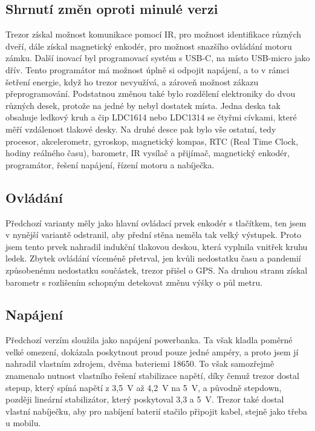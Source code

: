 \subsection*{Shrnutí změn oproti minulé verzi}

Trezor získal možnost komunikace pomocí IR, pro možnost identifikace růz\-ných dveří, dále získal magnetický enkodér, pro možnost snazšího ovládání
motoru zámku. 
Další inovací byl programovací systém s USB-C, na místo USB-micro jako dřív. Tento programátor má možnost úplně si odpojit napáje\-ní, a to v rámci šetření 
energie, když ho trezor nevyužívá, a zároveň možnost zákazu přeprogramování.
Podstatnou změnou také bylo rozdělení elektroniky do dvou různých desek, protože na jedné by nebyl dostatek místa. Jedna deska tak obsahuje ledkový 
kruh a čip LDC1614 nebo LDC1314 se čtyřmi cívkami, které měří vzdálenost tlakové desky. Na druhé desce pak bylo vše ostatní, tedy procesor, akcelerometr,
gyroskop, magnetický kompas, RTC (Real Time Clock, hodiny reálného času), barometr, IR vysílač a přijímač, magnetický enkodér, programátor, řešení 
napájení, řízení motoru a nabíječka.

\subsection*{Ovládání}
Předchozí varianty měly jako hlavní ovládací prvek enkodér s tlačítkem, ten jsem v nynější variantě odstranil, aby přední stěna neměla tak velký 
výstupek. Proto jsem tento prvek nahradil indukční tlakovou deskou, která vyplnila vnitřek kruhu ledek. 
Zbytek ovládání víceméně přetrval, jen kvůli nedostatku času a pandemií způsobenému nedostatku součástek, trezor přišel o GPS. Na druhou stranu 
získal barometr s rozlišením schopným detekovat změnu výšky o půl metru.

\subsection*{Napájení}
Předchozí verzím sloužila jako napájení powerbanka. Ta však kladla poměrné velké omezení, dokázala poskytnout proud pouze jedné ampéry, a proto 
jsem jí nahradil vlastním zdrojem, dvěma bateriemi 18650. To však samozřejmě znamenalo nutnost vlastního řešení stabilizace napětí, díky čemuž 
trezor dostal stepup, který spíná napětí z 3,5~V až 4,2~V na 5~V, a původně stepdown, později lineární stabilizátor, který poskytoval 3,3 a 5~V. %
Trezor také dostal vlastní nabíječku, aby pro nabíjení baterií stačilo připojit kabel, stejně jako třeba u mobilu.

\newpage